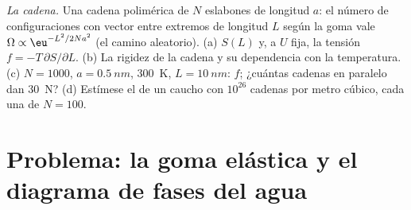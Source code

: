 \begin{exercise}[$\star\star\star$]\label{exo:b2:thermodynamic-potentials:12}
\emph{La cadena.} Una cadena polimérica de $N$ eslabones de longitud $a$: el
número de configuraciones con vector entre extremos de longitud $L$ según
la goma vale $\Omega \propto \eu^{-L^2/2Na^2}$ (el camino aleatorio). (a) $S(L)$
y, a $U$ fija, la tensión $f = -T\,\partial S/\partial L$. (b) La
rigidez de la cadena y su dependencia con la temperatura. (c) $N = 1000$, $a =
\qty{0.5}{nm}$, \qty{300}{K}, $L = \qty{10}{nm}$: $f$; ¿cuántas cadenas en
paralelo dan \qty{30}{N}? (d) Estímese el  de un caucho
con $10^{26}$ cadenas por metro cúbico, cada una de $N = 100$.
\end{exercise}

\section{Problema: la goma elástica y el diagrama de fases del agua}

